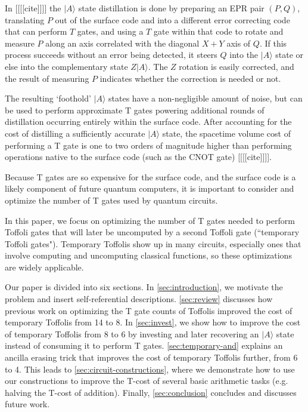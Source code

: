 \documentclass[twocolumn,longbibliography]{quantumarticle-customized}
\begin{document}
In [[[[cite]]]] the $|A\rangle$ state distillation is done by preparing an EPR pair $(P, Q)$, translating $P$ out of the surface code and into a different error correcting code that can perform $T$ gates, and using a $T$ gate within that code to rotate and measure $P$ along an axis correlated with the diagonal $X+Y$ axis of $Q$.
If this process succeeds without an error being detected, it steers \cite{Wiseman2007} $Q$ into the $|A\rangle$ state or else into the complementary state $Z|A\rangle$.
The $Z$ rotation is easily corrected, and the result of measuring $P$ indicates whether the correction is needed or not.

The resulting `foothold' $|A\rangle$ states have a non-negligible amount of noise, but can be used to perform approximate T gates powering additional rounds of distillation occurring entirely within the surface code.
After accounting for the cost of distilling a sufficiently accurate $|A\rangle$ state, the spacetime volume cost of performing a T gate is one to two orders of magnitude higher than performing operations native to the surface code (such as the CNOT gate) [[[[cite]]]].

Because T gates are so expensive for the surface code, and the surface code is a likely component of future quantum computers, it is important to consider and optimize the number of T gates used by quantum circuits.

In this paper, we focus on optimizing the number of T gates needed to perform Toffoli gates that will later be uncomputed by a second Toffoli gate (``temporary Toffoli gates").
Temporary Toffolis show up in many circuits, especially ones that involve computing and uncomputing classical functions, so these optimizations are widely applicable.

Our paper is divided into six sections.
In \autoref{sec:introduction}, we motivate the problem and insert self-referential descriptions.
\autoref{sec:review} discusses how previous work on optimizing the T gate counts of Toffolis improved the cost of temporary Toffolis from 14 to 8.
In \autoref{sec:invest}, we show how to improve the cost of temporary Toffolis from 8 to 6 by investing and later recovering an $|A\rangle$ state instead of consuming it to perform T gates.
\autoref{sec:temporary-and} explains an ancilla erasing trick that improves the cost of temporary Toffolis further, from 6 to 4.
This leads to \autoref{sec:circuit-constructions}, where we demonstrate how to use our constructions to improve the T-cost of several basic arithmetic tasks (e.g. halving the T-cost of addition).
Finally, \autoref{sec:conclusion} concludes and discusses future work.
\end{document}
